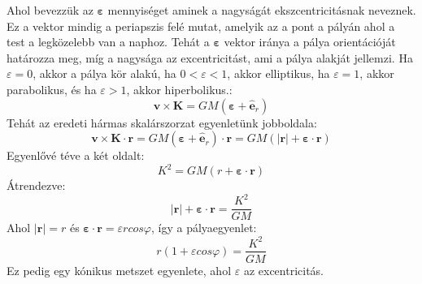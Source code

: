 \documentclass[../main.tex]{subfiles}
\begin{document}
Ahol bevezzük az $\boldsymbol{\varepsilon}$ mennyiséget aminek a nagyságát ekszcentricitásnak neveznek. Ez a vektor mindig a periapszis felé mutat, amelyik az a pont a pályán ahol a test a legközelebb van a naphoz. Tehát a $\boldsymbol{\varepsilon}$ vektor iránya a pálya orientációját határozza meg, míg a nagysága az excentricitást, ami a pálya alakját jellemzi. Ha $\varepsilon = 0$, akkor a pálya kör alakú, ha $0 < \varepsilon < 1$, akkor elliptikus, ha $\varepsilon = 1$, akkor parabolikus, és ha $\varepsilon > 1$, akkor hiperbolikus.:
\begin{equation}
    \mathbf{v} \times \mathbf{K} = GM (\boldsymbol{\varepsilon} + \hat{\mathbf{e}}_r)
\end{equation}
Tehát az eredeti hármas skalárszorzat egyenletünk jobboldala:
\begin{equation}
    \mathbf{v} \times \mathbf{K} \cdot \mathbf{r} = GM (\boldsymbol{\varepsilon} + \hat{\mathbf{e}}_r) \cdot \mathbf{r} = GM (|\mathbf{r}| + \boldsymbol{\varepsilon} \cdot \mathbf{r})
\end{equation}
Egyenlővé téve a két oldalt:
\begin{equation}
    K^2 = GM (r + \boldsymbol{\varepsilon} \cdot \mathbf{r})
\end{equation}
Átrendezve:
\begin{equation}
    |\mathbf{r}| + \boldsymbol{\varepsilon} \cdot \mathbf{r} = \frac{K^2}{GM}
\end{equation}
Ahol $|\mathbf{r}| = r$ és $\boldsymbol{\varepsilon} \cdot \mathbf{r} = \varepsilon r cos\varphi$, így a pályaegyenlet:
\begin{equation}
    r (1 + \varepsilon cos\varphi) = \frac{K^2}{GM}
\end{equation}
Ez pedig egy kónikus metszet egyenlete, ahol $\varepsilon$ az excentricitás.
\end{document}
